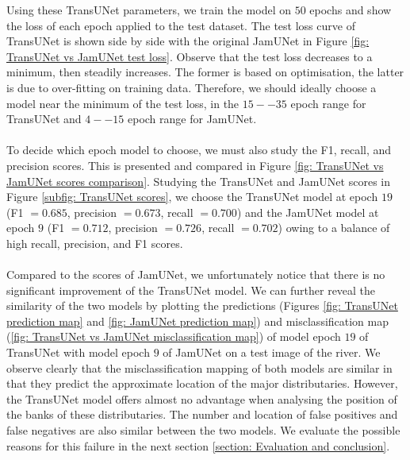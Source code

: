 \documentclass[10pt,oneside,a4paper,english]{article}
\begin{document}
\noindent Using these TransUNet parameters, we train the model on $50$ epochs and show the loss of each epoch applied to the test dataset. The test loss curve of TransUNet is shown side by side with the original JamUNet in Figure \ref{fig: TransUNet vs JamUNet test loss}. Observe that the test loss decreases to a minimum, then steadily increases. The former is based on optimisation, the latter is due to over-fitting on training data. Therefore, we should ideally choose a model near the minimum of the test loss, in the $ 15--35$ epoch range for TransUNet and $4--15$ epoch range for JamUNet. \\
\\
To decide which epoch model to choose, we must also study the F1, recall, and precision scores. This is presented and compared in Figure \ref{fig: TransUNet vs JamUNet scores comparison}. Studying the TransUNet and JamUNet scores in Figure \ref{subfig: TransUNet scores}, we choose the TransUNet model at epoch $19$ (F1 $= 0.685$, precision $= 0.673$, recall $= 0.700$) and the JamUNet model at epoch $9$ (F1 $= 0.712$, precision $= 0.726$, recall $= 0.702$) owing to a balance of high recall, precision, and F1 scores. \\
\\
Compared to the scores of JamUNet, we unfortunately notice that there is no significant improvement of the TransUNet model. We can further reveal the similarity of the two models by plotting the predictions (Figures \ref{fig: TransUNet prediction map} and \ref{fig: JamUNet prediction map}) and misclassification map (\ref{fig: TransUNet vs JamUNet misclassification map}) of model epoch $19$ of TransUNet with model epoch $9$ of JamUNet on a test image of the river. We observe clearly that the misclassification mapping of both models are similar in that they predict the approximate location of the major distributaries. However, the TransUNet model offers almost no advantage when analysing the position of the banks of these distributaries. The number and location of false positives and false negatives are also similar between the two models. We evaluate the possible reasons for this failure in the next section \ref{section: Evaluation and conclusion}.
\end{document}
